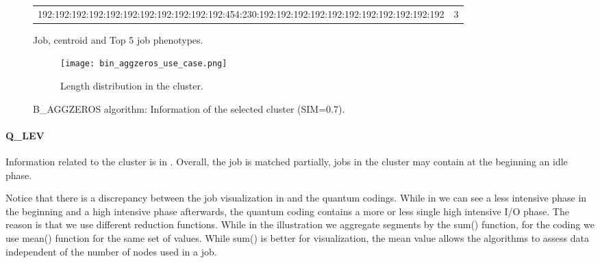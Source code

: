 \documentclass{jhps}
\begin{document}
\begin{figure}
\begin{subtable}{\textwidth}
\begin{tiny}
\begin{tabular}{l|r}
       192:192:192:192:192:192:192:192:192:192:192:454:230:192:192:192:192:192:192:192:192:192:192:192             & 3        \\ 
      \end{tabular}
		\end{tiny}
		\caption{Job, centroid and Top 5 job phenotypes.}
		\label{cluster:use_case:bin_aggzeros:top_jobs}
	\end{subtable}
	\medskip
	\begin{subfigure}{\textwidth}
		\centering
		\texttt{[image: bin\_aggzeros\_use\_case.png]}
		\caption{Length distribution in the cluster.}
		\label{cluster:use_case:bin_aggzeros:length}
	\end{subfigure}
	\caption{B\_AGGZEROS algorithm: Information of the selected cluster (SIM=0.7).}
	\label{cluster:use_case:bin_aggzeros}
\end{figure}


\FloatBarrier
\paragraph{Q\_LEV}
Information related to the cluster is in .
Overall, the job is matched partially, jobs in the cluster may contain at the beginning an idle phase.

Notice that there is a discrepancy between the job visualization in  and the quantum codings.
While in  we can see a less intensive phase in the beginning and a high intensive phase afterwards, the quantum coding contains a more or less single high intensive I/O phase.
The reason is that we use different reduction functions.
While in the illustration we aggregate segments by the sum() function, for the coding we use mean() function for the same set of values.
While sum() is better for visualization, the mean value allows the algorithms to assess data independent of the number of nodes used in a job.
\end{document}
